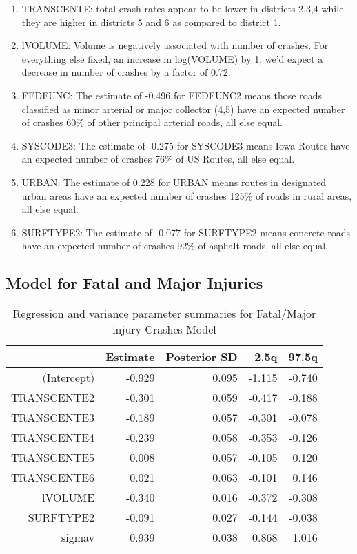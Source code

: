 \documentclass[a4paper]{article}\usepackage[]{graphicx}\usepackage[]{color}
\begin{document}
\begin{enumerate}
\item
TRANSCENTE: total crash rates appear to be lower in districts 2,3,4 while they are higher in districts 5 and 6 as compared to district 1. 

\item
lVOLUME: Volume is negatively associated with number of crashes. For everything else fixed, an increase in log(VOLUME) by 1, we'd expect a decrease in number of crashes by a factor of 0.72.

\item
FEDFUNC: The estimate of -0.496 for FEDFUNC2 means those roads classified as minor arterial or major collector (4,5) have an expected number of crashes 60\% of other principal arterial roads, all else equal. 

\item
SYSCODE3: The estimate of -0.275 for SYSCODE3 means Iowa Routes have an expected number of crashes 76\% of US Routes, all else equal.

\item
URBAN: The estimate of 0.228 for URBAN means routes in designated urban areas have an expected number of crashes 125\% of roads in rural areas, all else equal.

\item
SURFTYPE2: The estimate of -0.077 for SURFTYPE2 means concrete roads have an expected number of crashes 92\% of asphalt roads, all else equal.

\end{enumerate}

\clearpage
\subsection{Model for Fatal and Major Injuries}


\begin{table}[h!]
\centering
\begin{tabular}{rrrrr}
  \hline
 & Estimate & Posterior SD & 2.5q & 97.5q \\ 
  \hline
(Intercept) & -0.929 & 0.095 & -1.115 & -0.740 \\ 
  TRANSCENTE2 & -0.301 & 0.059 & -0.417 & -0.188 \\ 
  TRANSCENTE3 & -0.189 & 0.057 & -0.301 & -0.078 \\ 
  TRANSCENTE4 & -0.239 & 0.058 & -0.353 & -0.126 \\ 
  TRANSCENTE5 & 0.008 & 0.057 & -0.105 & 0.120 \\ 
  TRANSCENTE6 & 0.021 & 0.063 & -0.101 & 0.146 \\ 
  lVOLUME & -0.340 & 0.016 & -0.372 & -0.308 \\ 
  SURFTYPE2 & -0.091 & 0.027 & -0.144 & -0.038 \\ 
  sigmav & 0.939 & 0.038 & 0.868 & 1.016 \\ 
   \hline
\end{tabular}
\caption{Regression and variance parameter summaries for Fatal/Major injury Crashes Model} 
\label{fatmajcrash}
\end{table}
\end{document}
